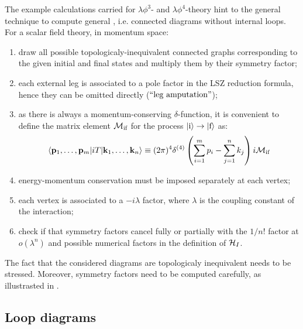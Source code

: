 The example calculations carried for $ \lambda \phi^3 $- and $ \lambda \phi^4 $-theory hint to the general technique to compute general , i.e. connected diagrams without internal loops. For a scalar field theory, in momentum space:
\begin{enumerate}
  \item draw all possible topologicaly-inequivalent connected graphs corresponding to the given initial and final states and multiply them by their symmetry factor;
  \item each external leg is associated to a pole factor in the LSZ reduction formula, hence they can be omitted directly ($ ``\text{leg amputation}" $);
  \item as there is always a momentum-conserving $ \delta $-function, it is convenient to define the matrix element $ \mathcal{M}_\text{if} $ for the process $ \ket{\text{i}} \rightarrow \ket{\text{f}} $ as:
    \begin{equation}
      \braket{\mathbf{p}_1 , \dots , \mathbf{p}_m | i T | \mathbf{k}_1 , \dots , \mathbf{k}_n} \equiv (2\pi)^4 \delta^{(4)}\left( \sum_{i = 1}^{m} p_i - \sum_{j = 1}^{n} k_j \right) i \mathcal{M}_\text{if}
      \label{eq:mat-el}
    \end{equation}
  \item energy-momentum conservation must be imposed separately at each vertex;
  \item each vertex is associated to a $ -i \lambda $ factor, where $ \lambda $ is the coupling constant of the interaction;
  \item check if that symmetry factors cancel fully or partially with the $ 1/n! $ factor at $ o(\lambda^n) $ and possible numerical factors in the definition of $ \mathcal{H}_I $.
\end{enumerate}

The fact that the considered diagrams are topologicaly inequivalent needs to be stressed. Moreover, symmetry factors need to be computed carefully, as illustrasted in .

\subsection{Loop diagrams}

